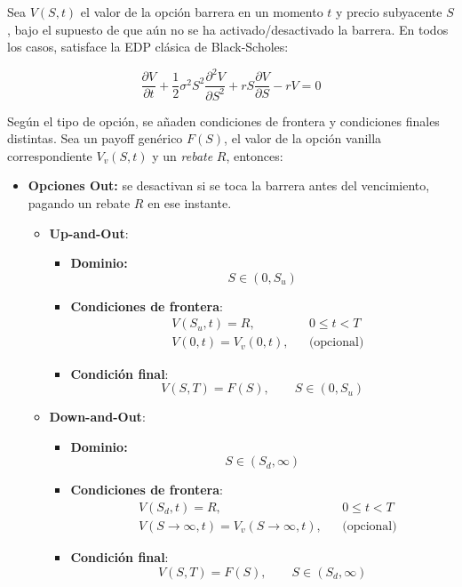 Sea $V(S,t)$ el valor de la opción barrera en un momento $t$ y precio subyacente $S$, bajo el supuesto de que aún no se ha activado/desactivado la barrera. En todos los casos, satisface la EDP clásica de Black-Scholes:

\[
    \boxed{\frac{\partial V}{\partial t} + \frac{1}{2} \sigma^2 S^2 \frac{\partial^2 V}{\partial S^2} + r S \frac{\partial V}{\partial S} - r V = 0}
\]

Según el tipo de opción, se añaden condiciones de frontera y condiciones finales distintas. Sea un payoff genérico $F(S)$, el valor de la opción vanilla correspondiente $V_v(S,t)$ y un \emph{rebate} $R$, entonces:

\begin{itemize}
    \item \textbf{Opciones Out:} se desactivan si se toca la barrera antes del vencimiento, pagando un rebate $R$ en ese instante.
    \begin{itemize}
        \item \textbf{Up-and-Out}:
        \begin{itemize}
            \item \textbf{Dominio:}
                \[
                    \boxed{S\in(0, S_u)}
                \]
            \item \textbf{Condiciones de frontera}: 
                \[
                    \boxed{
                        \begin{aligned}
                            &V(S_u, t) = R, && 0 \leq t < T \\
                            &V(0, t) = V_v(0, t), && \text{(opcional)}
                        \end{aligned}
                    }
                \]
            \item \textbf{Condición final}:
                \[
                    \boxed{
                        V(S,T) = F(S), \qquad S\in(0, S_u)
                    }
                \]
        \end{itemize}

        \item \textbf{Down-and-Out}:
        \begin{itemize}
            \item \textbf{Dominio:}
                \[
                    \boxed{S\in(S_d, \infty)}
                \]
            \item \textbf{Condiciones de frontera}: 
                \[
                    \boxed{
                        \begin{aligned}
                            &V(S_d, t) = R, && 0 \leq t < T \\
                            &V(S\rightarrow\infty, t) = V_v(S\rightarrow\infty, t), && \text{(opcional)}
                        \end{aligned}
                    }
                \]
            \item \textbf{Condición final}:
                \[
                    \boxed{
                        V(S,T) = F(S), \qquad S\in(S_d, \infty)
                    }
                \]
        \end{itemize}
    \end{itemize}


\end{itemize}
